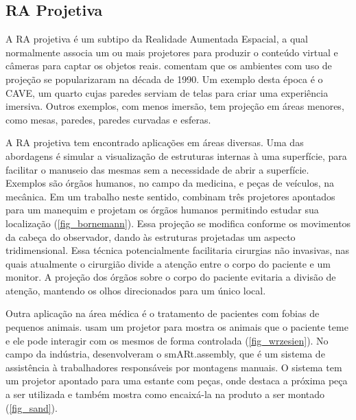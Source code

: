 \subsection{RA Projetiva}
\label{sub_aplicacoes_ra_projetiva}

A RA projetiva é um subtipo da Realidade Aumentada Espacial, a qual normalmente associa um ou mais projetores para produzir o conteúdo virtual e câmeras para captar os objetos reais.  comentam que os ambientes com uso de projeção se popularizaram na década de 1990. Um exemplo desta época é o CAVE, um quarto cujas paredes serviam de telas para criar uma experiência imersiva. Outros exemplos, com menos imersão, tem projeção em áreas menores, como mesas, paredes, paredes curvadas e esferas.

A RA projetiva tem encontrado aplicações em áreas diversas. Uma das abordagens é simular a visualização de estruturas internas à uma superfície, para facilitar o manuseio das mesmas sem a necessidade de abrir a superfície. Exemplos são órgãos humanos, no campo da medicina, e peças de veículos, na mecânica. Em um trabalho neste sentido,  combinam três projetores apontados para um manequim e projetam os órgãos humanos permitindo estudar sua localização (\autoref{fig_bornemann}). Essa projeção se modifica conforme os movimentos da cabeça do observador, dando às estruturas projetadas um aspecto tridimensional. Essa técnica potencialmente facilitaria cirurgias não invasivas, nas quais atualmente o cirurgião divide a atenção entre o corpo do paciente e um monitor. A projeção dos órgãos sobre o corpo do paciente evitaria a divisão de atenção, mantendo os olhos direcionados para um único local.

Outra aplicação na área médica é o tratamento de pacientes com fobias de pequenos animais.  usam um projetor para mostra os animais que o paciente teme e ele pode interagir com os mesmos de forma controlada (\autoref{fig_wrzesien}). No campo da indústria,  desenvolveram o smARt.assembly, que é um sistema de assistência à trabalhadores responsáveis por montagens manuais. O sistema tem um projetor apontado para uma estante com peças, onde destaca a próxima peça a ser utilizada e também mostra como encaixá-la na produto a ser montado (\autoref{fig_sand}).

